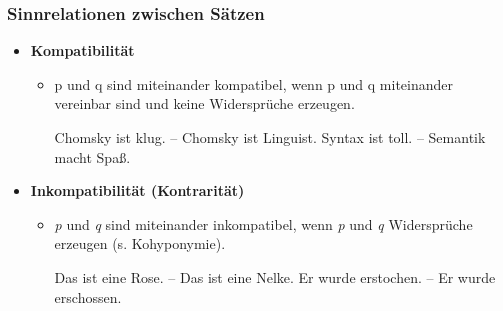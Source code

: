 
\begin{frame}
\frametitle{Sinnrelationen zwischen Sätzen}

\begin{itemize}
	\item \textbf{Kompatibilität}
	
\vspace{1em}
	
	\begin{itemize}
		\item p und q sind miteinander kompatibel, wenn  p und q 
miteinander vereinbar sind und keine Widersprüche erzeugen.

		\eal 
			\ex Chomsky ist klug. -- Chomsky ist Linguist.
			\ex Syntax ist toll. -- Semantik macht Spa\ss{}.
		\zl
		
	\end{itemize}
	
	\item \textbf{Inkompatibilität (Kontrarität)}
	
\vspace{1em}
	
	\begin{itemize}
		\item \textit{p} und \textit{q} sind miteinander inkompatibel, wenn \textit{p} und \textit{q}
Widersprüche erzeugen (s. Kohyponymie).

		\eal 
			\ex Das ist eine Rose. -- Das ist eine Nelke.
			\ex Er wurde erstochen. -- Er wurde erschossen.
		\zl

	\end{itemize}
	
\end{itemize}


\end{frame}




